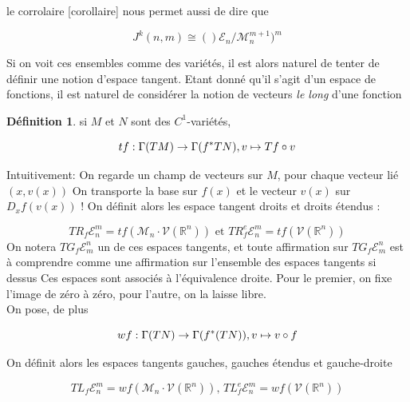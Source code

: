 \documentclass[a4paper,12pt,oneside,titlepage]{article}
\newcommand{\gentan}[3]{TG_{#1}\mathcal{E}^{#2}_{#3}}
\newcommand{\R}[0]{\mathbb{R}}
\theoremstyle{definition}
\newtheorem{definition}{Définition}[section]
\theoremstyle{plain}
\begin{document}
le corrolaire [corollaire] nous permet aussi de dire que

\begin{equation*}
    J^k(n,m)\cong ()\mathcal{E}_n /\mathcal{M}_n^{m+1})^m
\end{equation*}


Si on voit ces ensembles comme des variétés, il est alors naturel de tenter de définir une notion d'espace tangent. Etant donné qu'il s'agit d'un espace de fonctions, il est naturel de considérer la notion de vecteurs \textit{le long} d'une fonction 

\begin{definition}
    si $M$ et $N$ sont des $C^1$-variétés, 
\end{definition}


\begin{equation*}
    tf: \Gamma(TM)\rightarrow \Gamma (f^*TN) ,\space v\mapsto Tf\circ v
\end{equation*}


Intuitivement: On regarde un champ de vecteurs sur $M$, pour chaque vecteur lié $(x,v(x))$ On transporte la base sur $f(x)$ et le vecteur $v(x)$ sur $D_xf(v(x))$ ! 
On définit alors les espace tangent droits et droits étendus : 

\begin{equation*}
    TR_f\mathcal{E}^m_n =tf(\mathcal{M}_n\cdot \mathcal{V}(\R^n))\text{ et }
    TR^e_f\mathcal{E}_n^m  = tf(\mathcal{V}(\R^n))
\end{equation*}
On notera $\gentan{f}{n}{m}$ un de ces espaces tangents, et toute affirmation sur $\gentan{f}{n}{m}$ est à comprendre comme une affirmation sur l'ensemble des espaces tangents si dessus
Ces espaces sont associés à l'équivalence droite. Pour le premier, on fixe l'image de zéro à zéro, pour l'autre, on la laisse libre.\\
On pose, de plus


\begin{equation*}
    wf: \Gamma(TN)\rightarrow \Gamma(f^*(TN)),\space v\mapsto  v\circ f
\end{equation*}


On définit alors les espaces tangents gauches, gauches étendus et gauche-droite



\begin{equation*}
    TL_f\mathcal{E}^m_n =wf(\mathcal{M}_n\cdot \mathcal{V}(\R^n))\text{,   }
    TL^e_f\mathcal{E}_n^m  = wf(\mathcal{V}(\R^n))
\end{equation*}
\end{document}
